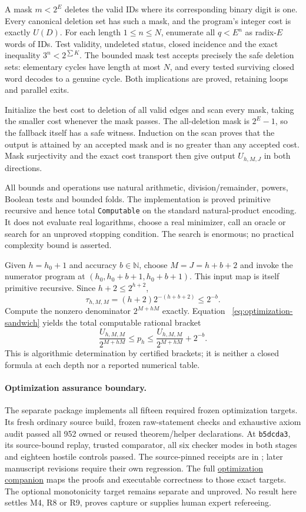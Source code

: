 \documentclass[11pt,letterpaper]{article}
\newcommand{\NN}{\mathbb{N}}
\begin{document}
A mask $m<2^E$ deletes the valid IDs where its corresponding binary digit is
one. Every canonical deletion set has such a mask, and the program's integer
cost is exactly $U(D)$. For each length $1\le n\le N$, enumerate all
$q<E^n$ as radix-$E$ words of IDs. Test validity, undeleted status, closed
incidence and the exact inequality $3^n<2^{\sum K}$. The bounded mask test
accepts precisely the safe deletion sets: elementary cycles have length at
most $N$, and every tested surviving closed word decodes to a genuine cycle.
Both implications are proved, retaining loops and parallel exits.

Initialize the best cost to deletion of all valid edges and scan every mask,
taking the smaller cost whenever the mask passes. The all-deletion mask is
$2^E-1$, so the fallback itself has a safe witness. Induction on the scan
proves that the output is attained by an accepted mask and is no greater
than any accepted cost. Mask surjectivity and the exact cost transport then
give output $U_{h,M,J}$ in both directions.

All bounds and operations use natural arithmetic, division/remainder,
powers, Boolean tests and bounded folds. The implementation is proved
primitive recursive and hence total \texttt{Computable} on the standard
natural-product encoding. It does not evaluate real logarithms, choose a
real minimizer, call an oracle or search for an unproved stopping condition.
The search is enormous; no practical complexity bound is asserted.

Given $h=h_0+1$ and accuracy $b\in\NN$, choose $M=J=h+b+2$ and invoke the
numerator program at $(h_0,h_0+b+1,h_0+b+1)$. This input map is itself
primitive recursive. Since $h+2\le2^{h+2}$,
\[
 \tau_{h,M,M}=(h+2)2^{-(h+b+2)}\le2^{-b}.
\]
Compute the nonzero denominator $2^{M+hM}$ exactly. Equation~
\eqref{eq:optimization-sandwich} yields the total computable rational bracket
\[
 \frac{U_{h,M,M}}{2^{M+hM}}\le p_h
 \le\frac{U_{h,M,M}}{2^{M+hM}}+2^{-b}.
\]
This is algorithmic determination by certified brackets; it is neither a
closed formula at each depth nor a reported numerical table.

\paragraph{Optimization assurance boundary.}
The separate  package implements all fifteen
required frozen optimization targets. Its fresh ordinary source build,
frozen raw-statement checks and exhaustive axiom audit passed all 952 owned
or reused theorem/helper declarations. At \texttt{b5dcda3}, its source-bound replay, trusted comparator,
all six checker modes in both stages and eighteen hostile controls passed.
The source-pinned receipts are in ;
later manuscript revisions require their own regression. The full
\href{../../lean/external_optimization/OPTIMIZATION_PROOF.md}{optimization companion}
maps the proofs and executable correctness to those exact targets.
The optional monotonicity target remains separate and unproved. No result
here settles M4, R8 or R9, proves capture or supplies human expert refereeing.
\end{document}
